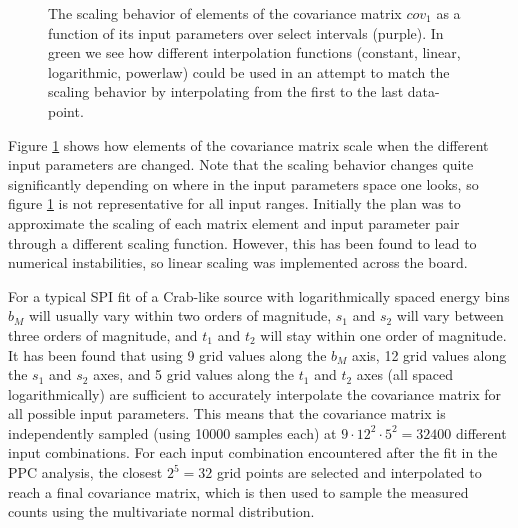 \documentclass{report}
\begin{document}
\begin{figure}[h]
  \centering
  \caption{The scaling behavior of elements of the covariance matrix $cov_1$ as a function of its input parameters over select intervals (purple). In green we see how different interpolation functions (constant, linear, logarithmic, powerlaw) could be used in an attempt to match the scaling behavior by interpolating from the first to the last data-point. }
  \label{fig ppc scaling}
\end{figure}

Figure \ref{fig ppc scaling} shows how elements of the covariance matrix scale when the different input parameters are changed. Note that the scaling behavior changes quite significantly depending on where in the input parameters space one looks, so figure \ref{fig ppc scaling} is not representative for all input ranges. Initially the plan was to approximate the scaling of each matrix element and input parameter pair through a different scaling function. However, this has been found to lead to numerical instabilities, so linear scaling was implemented across the board.

For a typical SPI fit of a Crab-like source with logarithmically spaced energy bins $b_M$ will usually vary within two orders of magnitude, $s_1$ and $s_2$ will vary between three orders of magnitude, and $t_1$ and $t_2$ will stay within one order of magnitude. It has been found that using 9 grid values along the $b_M$ axis, 12 grid values along the $s_1$ and $s_2$ axes, and 5 grid values along the $t_1$ and $t_2$ axes (all spaced logarithmically) are sufficient to accurately interpolate the covariance matrix for all possible input parameters. This means that the covariance matrix is independently sampled (using 10000 samples each) at $9\cdot12^2\cdot5^2=32400$ different input combinations. For each input combination encountered after the fit in the PPC analysis, the closest $2^5=32$ grid points are selected and interpolated to reach a final covariance matrix, which is then used to sample the measured counts using the multivariate normal distribution. 
\end{document}
